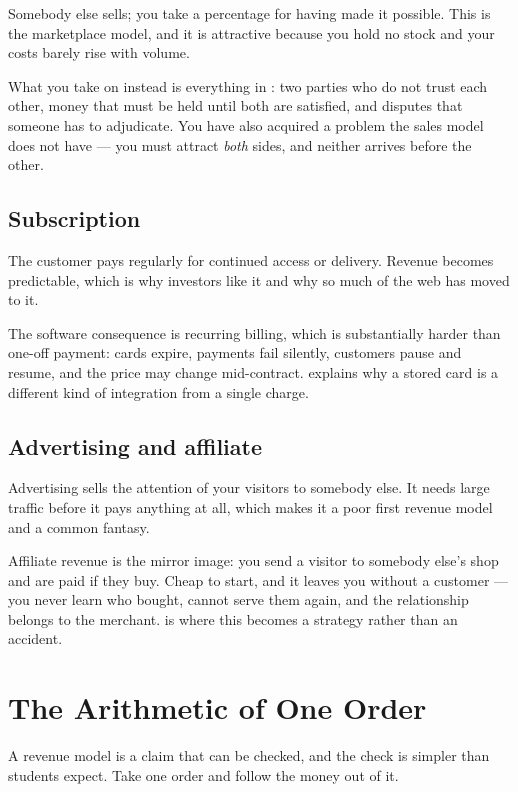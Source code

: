 Somebody else sells; you take a percentage for having made it possible. This is
the marketplace model, and it is attractive because you hold no stock and your
costs barely rise with volume.

What you take on instead is everything in : two parties who do
not trust each other, money that must be held until both are satisfied, and
disputes that someone has to adjudicate. You have also acquired a problem the
sales model does not have --- you must attract \emph{both} sides, and neither
arrives before the other.

\subsection{Subscription}

The customer pays regularly for continued access or delivery. Revenue becomes
predictable, which is why investors like it and why so much of the web has
moved to it.

The software consequence is recurring billing, which is substantially harder
than one-off payment: cards expire, payments fail silently, customers pause and
resume, and the price may change mid-contract.  explains why
a stored card is a different kind of integration from a single charge.

\subsection{Advertising and affiliate}

Advertising sells the attention of your visitors to somebody else. It needs
large traffic before it pays anything at all, which makes it a poor first
revenue model and a common fantasy.

Affiliate revenue is the mirror image: you send a visitor to somebody else's
shop and are paid if they buy. Cheap to start, and it leaves you without a
customer --- you never learn who bought, cannot serve them again, and the
relationship belongs to the merchant.  is where this becomes a
strategy rather than an accident.

\section{The Arithmetic of One Order}

A revenue model is a claim that can be checked, and the check is simpler than
students expect. Take one order and follow the money out of it.

